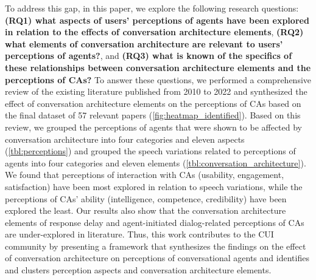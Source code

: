 To address this gap, in this paper, we
explore the following research questions: \textbf{(RQ1) what aspects of users' perceptions of agents have been explored in relation to the effects of conversation architecture elements}, \textbf{(RQ2) what elements of conversation architecture are relevant to users' perceptions of agents?}, and \textbf{(RQ3) what is known of the specifics of these relationships between conversation architecture elements and the perceptions of CAs?}
To answer these questions, we performed a comprehensive review of the existing literature published from 2010 to 2022 and synthesized the effect of conversation architecture elements on the perceptions of CAs based on the final dataset of 57 relevant papers (\autoref{fig:heatmap_identified}). Based on this review, we grouped the perceptions of agents that were shown to be affected by conversation architecture into four categories and eleven aspects (\autoref{tbl:perceptions}) and grouped the speech variations related to perceptions of agents into four categories and eleven elements (\autoref{tbl:conversation_architecture}). 
We found that perceptions of interaction with CAs (usability, engagement, satisfaction) have been most explored in relation to speech variations, while the perceptions of CAs' ability (intelligence, competence, credibility) have been explored the least.
Our results also show that the conversation architecture elements of response delay and agent-initiated dialog-related perceptions of CAs are under-explored in literature. 
Thus, this work contributes to the CUI community by presenting a framework that synthesizes the findings on the effect of conversation architecture on perceptions of conversational agents and identifies and clusters perception aspects and conversation architecture elements. %

